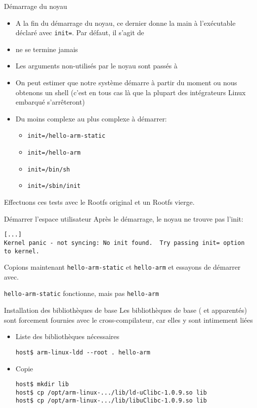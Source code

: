 \begin{frame}[fragile=singleslide]{Démarrage du noyau}
  \begin{itemize}
  \item A  la fin du  démarrage du noyau, ce  dernier donne la  main à
    l'exécutable déclaré  avec \verb+init=+. Par défaut,  il s'agit de
  \item {} ne se termine jamais
  \item  Les  arguments  non-utilisés  par le  noyau  sont  passés  à
  \item On peut  estimer que notre système démarre  à partir du moment
    ou nous obtenons un shell (c'est en tous cas là que la plupart des
    intégrateurs Linux embarqué s'arrêteront)
  \item Du moins complexe au plus complexe à démarrer:
  \begin{itemize}
    \item \verb+init=/hello-arm-static+
    \item \verb+init=/hello-arm+
    \item \verb+init=/bin/sh+
    \item \verb+init=/sbin/init+
    \end{itemize}
  \end{itemize}
  Effectuons ces tests avec le Rootfs original et un Rootfs vierge.
\end{frame}

\begin{frame}[fragile=singleslide]{Démarrer l'espace utilisateur}
  Après le démarrage, le noyau ne trouve pas l'init:
    \begin{lstlisting}
[...]
Kernel panic - not syncing: No init found.  Try passing init= option to kernel.
    \end{lstlisting}

    Copions maintenant  \verb+hello-arm-static+ et \verb+hello-arm+ et
    essayons de démarrer avec.

     \verb+hello-arm-static+ fonctionne, mais pas \verb+hello-arm+
\end{frame}

\begin{frame}[fragile=singleslide]{Installation des bibliothèques de base}
  Les bibliothèques de base  ( et apparentés) sont forcement
  fournies avec le cross-compilateur, car elles y sont intimement liées
  \begin{itemize}
  \item Liste des bibliothèques nécessaires
    \begin{lstlisting}
host$ arm-linux-ldd --root . hello-arm
    \end{lstlisting}
    \item Copie
    \begin{lstlisting}
host$ mkdir lib
host$ cp /opt/arm-linux-.../lib/ld-uClibc-1.0.9.so lib
host$ cp /opt/arm-linux-.../lib/libuClibc-1.0.9.so lib
    \end{lstlisting}
  \end{itemize}
\end{frame}

